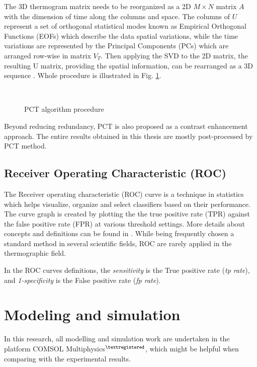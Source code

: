 The 3D thermogram matrix needs to be reorganized as a 2D $M\times N$ matrix $A$ with the dimension of time along the columns and space. The columns of $U$ represent a set of orthogonal statistical modes known as Empirical
Orthogonal Functions (EOFs) which describe the data spatial variations, while the time variations are represented by the Principal Components (PCs) which are arranged row-wise in matrix $V_T$. Then applying the SVD to the 2D matrix, the resulting U matrix, providing the spatial information, can be rearranged as a 3D sequence \citep{Ibarra-Castanedo2006}. Whole procedure is illustrated in Fig. \ref{PCT_SVD}.
\begin{figure}[htbp]
	\centering
	\\
	\caption{PCT algorithm procedure}
	\label{PCT_SVD}
\end{figure}

Beyond reducing redundancy, PCT is also proposed as a contrast enhancement approach.
The entire results obtained in this thesis are mostly post-processed by PCT method.

\subsection{Receiver Operating 	Characteristic (ROC)}
The Receiver operating characteristic (ROC) curve is a technique in statistics which helps visualize, organize and select classifiers based on their performance. The curve graph is created by plotting the the true positive rate (TPR) against the false positive rate (FPR) at various threshold settings. More details about concepts and definitions can be found in \citep{Fawcett2006}. While being frequently chosen a standard method in several scientific fields, ROC are rarely applied in the thermographic field.\citep{Bison2014a} 

In the ROC curves definitions, the \textit{sensitivity} is the True positive rate (\textit{tp rate}), and \textit{1-specificity} is the False positive rate (\textit{fp rate}).


\section{Modeling and simulation}
In this research, all modelling and simulation work are undertaken in the platform COMSOL Multiphysics$^{\textregistered}$, which might be helpful when comparing with the experimental results.

